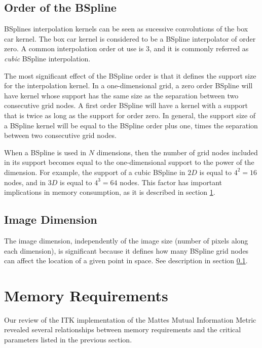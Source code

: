 \documentclass{InsightArticle}
\begin{document}
\subsection{Order of the BSpline}
\label{sec:BSplineOrder}

BSplines interpolation kernels can be seen as sucessive convolutions of the box
car kernel. The box car kernel is considered to be a BSpline interpolator of
order zero. A common interpolation order ot use is $3$, and it is commonly
referred as \emph{cubic} BSpline interpolation.

The most significant effect of the BSpline order is that it defines the support
size for the interpolation kernel. In a one-dimensional grid, a zero order
BSpline will have kernel whose support has the same size as the separation
between two consecutive grid nodes. A first order BSpline will have a kernel
with a support that is twice as long as the support for order zero. In general,
the support size of a BSpline kernel will be equal to the BSpline order plus
one, times the separation between two consecutive grid nodes.

When a BSpline is used in $N$ dimensions, then the number of grid nodes
included in its support becomes equal to the one-dimensional support to the
power of the dimension. For example, the support of a cubic BSpline in $2D$ is
equal to $4^2=16$ nodes, and in $3D$ is equal to $4^3=64$ nodes. This factor
has important implications in memory consumption, as it is described in section
\ref{sec:MemoryRequirements}.

\subsection{Image Dimension}

The image dimension, independently of the image size (number of pixels along
each dimension), is significant because it defines how many BSpline grid nodes
can affect the location of a given point in space. See description in section
\ref{sec:BSplineOrder}.

\section{Memory Requirements}
\label{sec:MemoryRequirements}

Our review of the ITK implementation of the Mattes Mutual Information Metric
revealed several relationships between memory requirements and the critical
parameters listed in the previous section.
\end{document}
